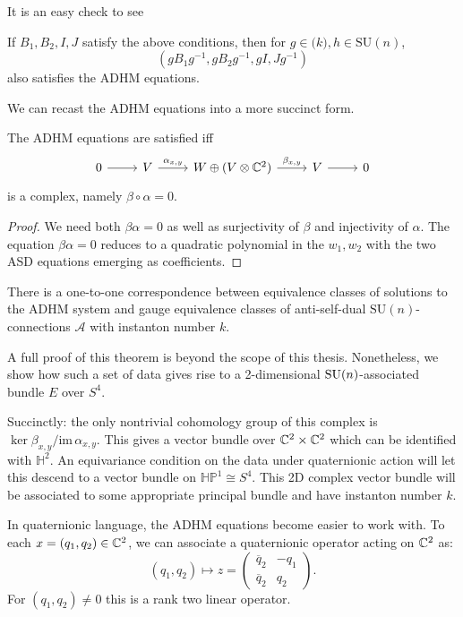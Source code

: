 	It is an easy check to see
	\begin{obs}
		If $B_1, B_2, I, J$ satisfy the above conditions, then for $g \in \mathrm(k), h \in \mathrm{SU}(n)$, 
		\[
			(g B_1 g^{-1}, g B_2 g^{-1}, gI, Jg^{-1})
		\]
		also satisfies the ADHM equations.
	\end{obs}
	
	We can recast the ADHM equations into a more succinct form.
	\begin{prop}
		The ADHM equations are satisfied iff
		\[
		\begin{tikzcd}
			0 \arrow[r]&V \arrow[r,"\alpha_{x,y}"] & W \oplus (V \otimes \cc^2) \arrow[r,"\beta_{x,y}"] & V \arrow[r] & 0
		\end{tikzcd}
		\]
		is a complex, namely $\beta \circ \alpha = 0$.
	\end{prop}
	\begin{proof}
		We need both $\beta \alpha = 0$ as well as surjectivity of $\beta$ and injectivity of $\alpha$. The equation $\beta \alpha = 0$ reduces to a quadratic polynomial in the $w_1, w_2$ with the two ASD equations emerging as coefficients.
	\end{proof}
	
	
	\begin{theorem}
		There is a one-to-one correspondence between equivalence classes of solutions to the ADHM system and gauge equivalence classes of anti-self-dual $\mathrm{SU}(n)$-connections $\mathcal A$ with instanton number $k$.
	\end{theorem}
	
	A full proof of this theorem is beyond the scope of this thesis. Nonetheless, we show how such a set of data gives rise to a 2-dimensional $\mathrm{SU}(n)$-associated bundle $E$ over $S^4$. 
	
	Succinctly: the only nontrivial cohomology group of this complex is $\ker \beta_{x,y}/ \mathrm{im}\, \alpha_{x,y}$. This gives a vector bundle over $\mathbb{C}^2 \times \mathbb{C}^2$ which can be identified with $\mathbb H^2$. An equivariance condition on the data under quaternionic action will let this descend to a vector bundle on $\mathbb{HP}^1 \cong S^4$. This 2D complex vector bundle will be associated to some appropriate principal bundle and have instanton number $k$.
	
	In quaternionic language, the ADHM equations become easier to work with. To each $x = (q_1, q_2) \in \mathbb{C}^2$, we can associate a quaternionic operator acting on $\mathbb{C}^2$ as:
	\begin{equation}
		(q_1, q_2) \mapsto z = \begin{pmatrix}
			\overline q_2 & -q_1\\
			\overline q_2 & q_2
		\end{pmatrix}.
	\end{equation}
	For $(q_1, q_2) \neq 0$ this is a rank two linear operator.
	
